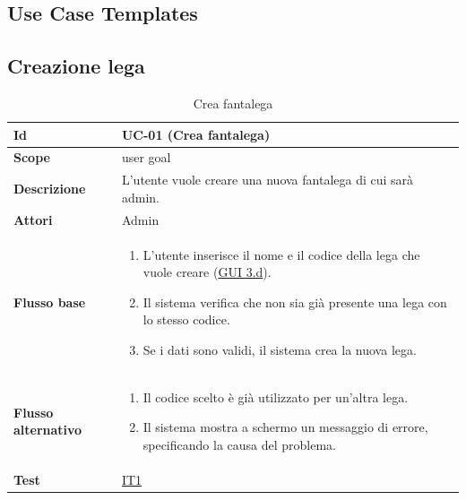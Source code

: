 \subsection{Use Case Templates}

\subsection{Creazione lega}
\begin{table}[H]
\caption{Crea fantalega}
\label{UC-01}

\begin{tabularx}{\textwidth}{|l|X|}
\hline
\textbf{Id} & UC-01 (Crea fantalega) \\
\hline
\textbf{Scope} & user goal \\
\hline
\textbf{Descrizione} & L'utente vuole creare una nuova fantalega di cui sarà admin. \\
\hline
\textbf{Attori} & Admin \\
\hline
\textbf{Flusso base} &
\begin{enumerate}[leftmargin=*]
    \item L'utente inserisce il nome e il codice della lega che vuole creare (\hyperref[fig:mockup_parte3]{GUI 3.d}).
    \item Il sistema verifica che non sia già presente una lega con lo stesso codice.
    \item Se i dati sono validi, il sistema crea la nuova lega.
\end{enumerate} \\
\hline
\textbf{Flusso alternativo} &
\begin{enumerate}[leftmargin=*,label=2.\arabic*]
    \item Il codice scelto è già utilizzato per un'altra lega.
    \item Il sistema mostra a schermo un messaggio di errore, specificando la causa del problema.
\end{enumerate} \\
\hline
\textbf{Test} & \hyperref[IT1]{IT1} \\
\hline
\end{tabularx}

\end{table}


